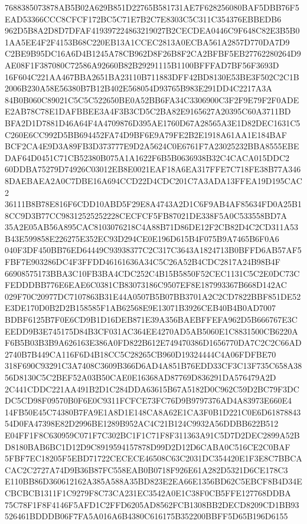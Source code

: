 \documentclass[UTF8,fontset=fandol,zihao=-4,a4paper]{ctexart}
\begin{document}
{{7688385073878AB5B02A629B851D22765B581731AE7F628256080BAF5DBB76F5EAD53366CCC8CFCF172BC5C71E7B2C7E8303C5C311C354376EBBEDB6
962D5B8A2D8D7DFAF419397224863219027B2CECDEA0446C9F648C82E3B5B01AA5EE4F2F4153B68C220EB13A1CCEC2813A0ECBA561A2857D770DA7D9
C2BE9B95DC16A6D4B1245A78CB962D8F26B8F2CA2BFBF5EB27762280264D9AE08F1F387080C72586A92660B82B29291115B1100BFFFAD7BF56F3693D
16F604C221AA467BBA2651BA23110B711883DFF42BD8130E53BE3F502C2C1B2006B230A58E56380B7B12B402E568054D93765B983E291DD4C2217A3A
84B0B060C89021C5C5C522650BE0A52BB6FA34C3306900C3F2F9E79F2F0ADEE2AB78C78E1DAFBBEE3A4F3B3CD5C2BA82E9165627A20395C60A3711BD
BFA2D1D7881D46A64F4A4709876D395AE1760D67A28565A3E1D82DEC1631C5C260E6CC992D5BB694452FA74D9BF6E9A79FE2B2E1918A61AA1E184BAF
BCF2CA4E9D3A89FB3D373777E9D2A5624C0E6761F7A23025232BBA8555EBEDAF64D0451C71CB52380B075A1A1622F6B5B0636938B32C4CACA015DDC2
60DDBA75279D74926C03012EB8E0021EAF18A6EA317FFE7C718FE38B77A3468DAEBAEA2A0C7DBE16A694CCD22D4CDC201C7A3ADA13FFEA19D195CAC2
36111B8B78E816F6CDD10ABD5F29E8A4743A2D1C6F9AB4AF85634FD0A25B18CC9D3B77CC98312525252228CECFCF5FB87021DE338F5A0C533558BD7A
35A2E05AB56A895CAC8103076218C4A88B71D86DE12F2CB82D4C2CD311A53B43E599858E226275E352EC93D294CE0E196D615B4F075B9A7465B6F0A6
040F3DF450BB76ED64449C93938377C2C317C3643A1824713B0BFFD6AB57AF5FBF7E903286DC4F3FFDD46161636A34C5C26A52B4CDC2817A24B98B4F
66908575173BBA3C10FB3BA4CDC252C4B15B5850F52CEC1131C5C2E0DC73CFEDDDBB776E6EAE6C0381CB83073186C9507EF8E187993367B668D142AC
029F70C20977DC7107863B31E44A0507B5B07BB3701A2C2CD7822BBF851DE52E3DE170D0B2D2B158585F1AB62568E9E13071B3926CEB40B4B0AD7007
BDBF6125B7F0E6CD9B1D16DEB871E39A356BAEBFFEFA962D5B666767E3CEEDD9B3E745175D84B3CF031AC364EE4270AD5AB5060E1C8831500CB6220A
F6B5B03B3B9A626163E386A0FD822B612E749470386D1656770DA7C2C2C66AD2740B7B449CA116F6D4B18CC5C28265CB960D19324444C4A06FDFBE70
318F690C93291C3A7408C3609B366D6AD4A851B76EDD33CF3C13F735C658A3856D8130C5C2BEF52A03B50CAE0E16368AD87769D836291DA576479A2D
2C441CDDC221AA491B2D1C284DDA63615B67A5182D0C962C59D2BC79F3DCDC5CD98F09570B0F6E0C9311FCFCE73FC76D9B9797376AD4A83973E660E4
14FB50E45C74380B7FA9E1A8D1E148CA8A62E1CA3F0B1D221C0E6D6187884354D0FA47398E82D2996BE1289B952AC4C21B124C9932A56DDBB622B512
E04FF1F8C630959C071F7C302BC1F1C71F8F311363A91C5D7D2DEC2899A52BD8180BAB6BC1D12D9C8919594157878D99D2D12D6CABA0C516CE2C0BAF
5FBF7EC18205F5EBD71722CECECE46508C63C2031DC354420E1F3E8C7BBCACAC2C2727A74D9B36B87FC558EAB0B0718F926E61A282D5321D6CE178C3
E110BB86D360612162A385A588A35BD823E2EA66E1356BD62C5EBCF8B4D34ECBCBCB1311F1C9279F8C73CA231EC3542A0E1C38F0CB5FFE127768DDBA
75C78F1F8F4146F5AFD1C2FFD6205AD8562FCB1308BB2DECD8209CD1BB93526461BDDDB06F7FA5A016A6B4380C616175B352200BBFF5D65B196D6155
}}
\end{document}
